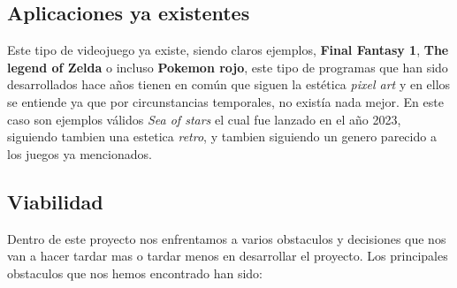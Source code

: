 \documentclass[a4paper]{article}
\begin{document}
    \subsection{Aplicaciones ya existentes}
    Este tipo de videojuego ya existe, siendo claros ejemplos, \textbf{Final Fantasy 1}, \textbf{The legend of Zelda} o incluso \textbf{Pokemon rojo}, este tipo de
    programas que han sido desarrollados hace años tienen en común que siguen la estética \textit{pixel art} y en ellos se entiende ya que por circunstancias temporales,
    no existía nada mejor. En este caso son ejemplos válidos \textit{Sea of stars} el cual fue lanzado en el año 2023, siguiendo tambien una estetica \textit{retro}, y tambien siguiendo
    un genero parecido a los juegos ya mencionados.
    \subsection{Viabilidad}
    Dentro de este proyecto nos enfrentamos a varios obstaculos y decisiones que nos van a hacer tardar mas o tardar menos en desarrollar el proyecto.
    Los principales obstaculos que nos hemos encontrado han sido:
\end{document}
